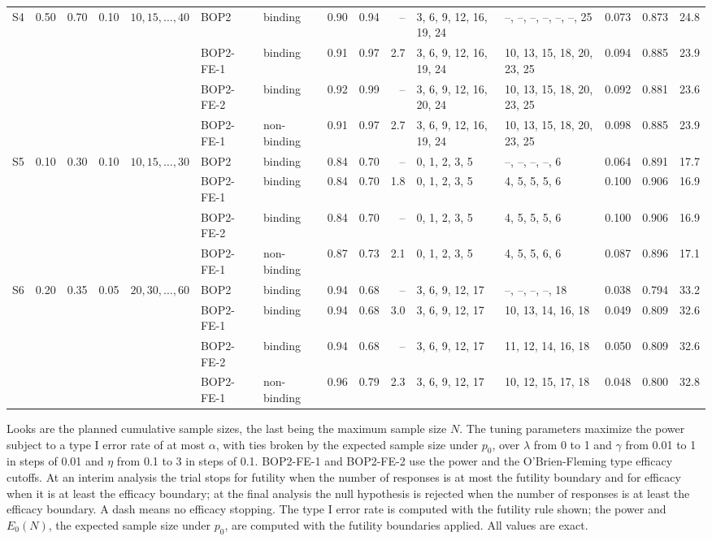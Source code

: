 \begin{table}
\begin{tabular}{lllllllrrrllrrr}
\midrule
S4 & 0.50 & 0.70 & 0.10 & $10, 15, \ldots, 40$ & BOP2 & binding & 0.90 & 0.94 & -- & 3, 6, 9, 12, 16, 19, 24 & --, --, --, --, --, --, 25 & 0.073 & 0.873 & 24.8 \\
 &  &  &  &  & BOP2-FE-1 & binding & 0.91 & 0.97 & 2.7 & 3, 6, 9, 12, 16, 19, 24 & 10, 13, 15, 18, 20, 23, 25 & 0.094 & 0.885 & 23.9 \\
 &  &  &  &  & BOP2-FE-2 & binding & 0.92 & 0.99 & -- & 3, 6, 9, 12, 16, 20, 24 & 10, 13, 15, 18, 20, 23, 25 & 0.092 & 0.881 & 23.6 \\
 &  &  &  &  & BOP2-FE-1 & non-binding & 0.91 & 0.97 & 2.7 & 3, 6, 9, 12, 16, 19, 24 & 10, 13, 15, 18, 20, 23, 25 & 0.098 & 0.885 & 23.9 \\
\midrule
S5 & 0.10 & 0.30 & 0.10 & $10, 15, \ldots, 30$ & BOP2 & binding & 0.84 & 0.70 & -- & 0, 1, 2, 3, 5 & --, --, --, --, 6 & 0.064 & 0.891 & 17.7 \\
 &  &  &  &  & BOP2-FE-1 & binding & 0.84 & 0.70 & 1.8 & 0, 1, 2, 3, 5 & 4, 5, 5, 5, 6 & 0.100 & 0.906 & 16.9 \\
 &  &  &  &  & BOP2-FE-2 & binding & 0.84 & 0.70 & -- & 0, 1, 2, 3, 5 & 4, 5, 5, 5, 6 & 0.100 & 0.906 & 16.9 \\
 &  &  &  &  & BOP2-FE-1 & non-binding & 0.87 & 0.73 & 2.1 & 0, 1, 2, 3, 5 & 4, 5, 5, 6, 6 & 0.087 & 0.896 & 17.1 \\
\midrule
S6 & 0.20 & 0.35 & 0.05 & $20, 30, \ldots, 60$ & BOP2 & binding & 0.94 & 0.68 & -- & 3, 6, 9, 12, 17 & --, --, --, --, 18 & 0.038 & 0.794 & 33.2 \\
 &  &  &  &  & BOP2-FE-1 & binding & 0.94 & 0.68 & 3.0 & 3, 6, 9, 12, 17 & 10, 13, 14, 16, 18 & 0.049 & 0.809 & 32.6 \\
 &  &  &  &  & BOP2-FE-2 & binding & 0.94 & 0.68 & -- & 3, 6, 9, 12, 17 & 11, 12, 14, 16, 18 & 0.050 & 0.809 & 32.6 \\
 &  &  &  &  & BOP2-FE-1 & non-binding & 0.96 & 0.79 & 2.3 & 3, 6, 9, 12, 17 & 10, 12, 15, 17, 18 & 0.048 & 0.800 & 32.8 \\
\bottomrule
\end{tabular}
\par\medskip
\begin{minipage}{0.95\textwidth}
\footnotesize
Looks are the planned cumulative sample sizes, the last being the maximum sample size $N$. The tuning parameters maximize the power subject to a type I error rate of at most $\alpha$, with ties broken by the expected sample size under $p_0$, over $\lambda$ from 0 to 1 and $\gamma$ from 0.01 to 1 in steps of 0.01 and $\eta$ from 0.1 to 3 in steps of 0.1. BOP2-FE-1 and BOP2-FE-2 use the power and the O'Brien-Fleming type efficacy cutoffs. At an interim analysis the trial stops for futility when the number of responses is at most the futility boundary and for efficacy when it is at least the efficacy boundary; at the final analysis the null hypothesis is rejected when the number of responses is at least the efficacy boundary. A dash means no efficacy stopping. The type I error rate is computed with the futility rule shown; the power and $E_0(N)$, the expected sample size under $p_0$, are computed with the futility boundaries applied. All values are exact.

\end{minipage}
\end{table}
